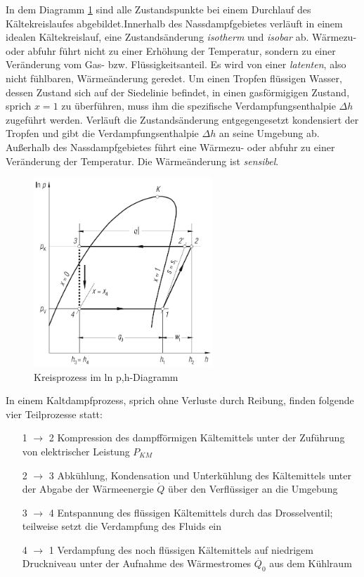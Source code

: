 In dem Diagramm \ref{fig:Komponeneten und p-h-Diagramm} sind alle Zustandspunkte bei einem Durchlauf des Kältekreislaufes abgebildet.Innerhalb des Nassdampfgebietes verläuft in einem idealen Kältekreislauf, eine Zustandsänderung \textit{isotherm} und \textit{isobar} ab. Wärmezu- oder abfuhr führt nicht zu einer Erhöhung der Temperatur, sondern zu einer Veränderung vom Gas- bzw. Flüssigkeitsanteil. Es wird von einer \textit{latenten}, also nicht fühlbaren,  Wärmeänderung geredet. Um einen Tropfen flüssigen Wasser, dessen Zustand sich auf der Siedelinie befindet, in einen gasförmigigen Zustand, sprich $x=1$ zu überführen, muss ihm die spezifische Verdampfungsenthalpie $\Delta h$ zugeführt werden. Verläuft die Zustandsänderung entgegengesetzt kondensiert der Tropfen und gibt die Verdampfungsenthalpie $\Delta h$ an seine Umgebung ab. 
Außerhalb des Nassdampfgebietes führt eine Wärmezu- oder abfuhr zu einer Veränderung der Temperatur. Die Wärmeänderung ist \textit{sensibel}. 

\begin{figure}[htb]
\centering		
\includegraphics[width=0.6\textwidth]{Pictures/log_p_h_Beahr.png}
\caption{Kreisprozess im ln p,h-Diagramm \citep{Baehr2013}}
\label{fig:Komponeneten und p-h-Diagramm}
\end{figure}


In einem  Kaltdampfprozess, sprich ohne Verluste durch Reibung, finden folgende vier Teilprozesse statt:

\begin{itemize}
\item[1 $\longrightarrow$ 2] Kompression des dampfförmigen Kältemittels unter der Zuführung von elektrischer Leistung $P_{KM}$
\item[2 $\longrightarrow$ 3] Abkühlung, Kondensation und Unterkühlung des Kältemittels unter der Abgabe der Wärmeenergie $\dot{Q}$ über den Verflüssiger an die Umgebung
\item[3 $\longrightarrow$ 4] Entspannung des flüssigen Kältemittels durch das Drosselventil; teilweise setzt die Verdampfung des Fluids ein 
\item[4 $\longrightarrow$ 1] Verdampfung des noch flüssigen Kältemittels auf niedrigem Druckniveau unter der Aufnahme des Wärmestromes $\dot{Q_0}$ aus dem Kühlraum
\end{itemize}

